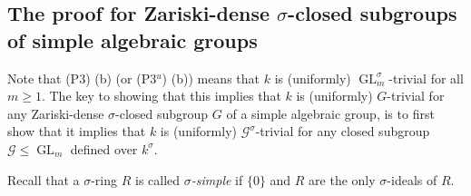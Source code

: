 \documentclass[oneside,reqno]{amsart}
\newtheorem{lemma}[theo]{Lemma}
\theoremstyle{definition}
\newcommand{\G}{\mathcal{G}}
\newcommand{\Gl}{\operatorname{GL}}
\newcommand{\s}{\sigma}
\newcommand{\Gm}{\mathbb{G}_m}
\newcommand{\Ga}{\mathbb{G}_a}
\newcommand{\pt}{{\rm{(P3$^u$)}}}
\newcommand{\ptweak}{{\rm{(P3)}}}
\begin{document}
%		
%		
%	
%	
%	
	



\subsection{The proof for Zariski-dense $\s$-closed subgroups of simple algebraic groups}

\label{subsec: Zariski dense in simple}


Note that \ptweak{} (b) (or \pt{} (b)) means that $k$ is (uniformly) $\Gl_m^\s$-trivial for all $m\geq 1$. The key to showing that this implies that $k$ is (uniformly) $G$-trivial for any Zariski-dense $\s$-closed subgroup $G$ of a simple algebraic group, is to first show that it implies that $k$ is (uniformly) $\G^\s$-trivial for any closed subgroup $\G\leq\Gl_m$ defined over $k^\s$.

Recall that a $\s$-ring $R$ is called \emph{$\s$-simple} if $\{0\}$ and $R$ are the only $\s$-ideals of $R$.
\end{document}
